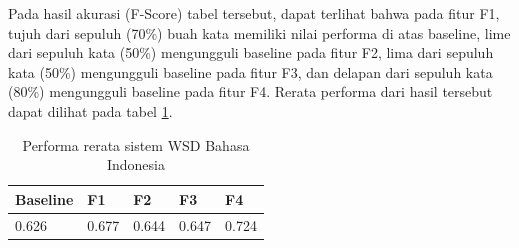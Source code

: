 Pada hasil akurasi (F-Score) tabel tersebut, dapat terlihat bahwa pada fitur F1, tujuh dari sepuluh (70\%) buah kata memiliki nilai performa di atas baseline, lime dari sepuluh kata (50\%) mengungguli baseline pada fitur F2, lima dari sepuluh kata (50\%) mengungguli baseline pada fitur F3, dan delapan dari sepuluh kata (80\%) mengungguli baseline pada fitur F4. Rerata performa dari hasil tersebut dapat dilihat pada tabel \ref{table:performa-rerata-wsd}.

\begin{table}
	\centering
	\caption{Performa rerata sistem WSD Bahasa Indonesia}
	\label{table:performa-rerata-wsd}
	\begin{tabular}{|p{2cm}|p{2cm}|p{2cm}|p{2cm}|p{2cm}|}
		\hline
		\textbf{Baseline} & \textbf{F1} & \textbf{F2} & \textbf{F3} & \textbf{F4} \\ \hline
		0.626 & 0.677 & 0.644 & 0.647 & 0.724 \\ \hline
	\end{tabular}
\end{table}

